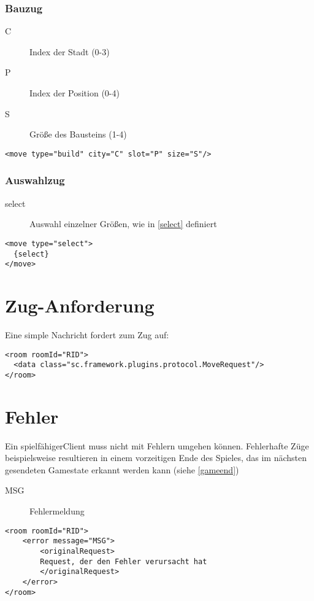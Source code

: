 \documentclass[12pt,a4paper, german, oneside]{scrartcl}
\begin{document}
\subsubsection{Bauzug}
\begin{description}
\item[C] Index der Stadt (0-3)
\item[P] Index der Position (0-4)
\item[S] Größe des Bausteins (1-4)
\end{description}
\begin{verbatim}
<move type="build" city="C" slot="P" size="S"/>
\end{verbatim}

\subsubsection{Auswahlzug}
\begin{description}
\item[select] Auswahl einzelner Größen, wie in \ref{select} definiert
\end{description}
\begin{verbatim}
<move type="select">
  {select}
</move>
\end{verbatim}

\section{\label{moverequest}Zug-Anforderung}
Eine simple Nachricht fordert zum Zug auf:
\begin{verbatim}
<room roomId="RID">
  <data class="sc.framework.plugins.protocol.MoveRequest"/>
</room>
\end{verbatim}

\section{Fehler}
Ein \glqq spielfähiger\grqq Client muss nicht mit Fehlern umgehen können. Fehlerhafte Züge beispielsweise resultieren in einem vorzeitigen Ende des Spieles, das im nächsten gesendeten Gamestate erkannt werden kann (siehe \ref{gameend})
\begin{description}
\item[MSG] Fehlermeldung
\end{description}
\begin{verbatim}
<room roomId="RID">
	<error message="MSG">
		<originalRequest>
		Request, der den Fehler verursacht hat
		</originalRequest>
	</error>
</room>
\end{verbatim}
\end{document}
